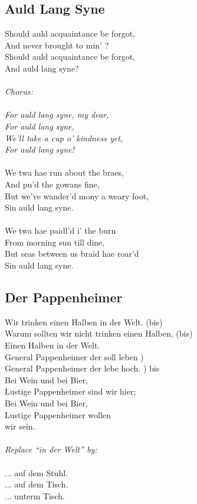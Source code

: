 \documentclass[a5paper]{article}
\begin{document}

\newpage

\subsection{Auld Lang Syne} %
\label{sub:auld_lang_syne}

Should auld acquaintance be forgot,\\
And never brought to min' ?\\
Should auld acquaintance be forgot,\\
And auld lang syne?\\
\\
\textit{Chorus:\\
\\
For auld lang syne, my dear,\\
For auld lang syne,\\
We'll take a cup o' kindness yet,\\
For auld lang syne!\\}
\\
We twa hae run about the braes,\\
And pu'd the gowans fine,\\
But we've wander'd mony a weary foot,\\
Sin auld lang syne.\\
\\
We twa hae paidl'd i’ the burn\\
From morning sun till dine,\\
But seas between us braid hae roar'd\\
Sin auld lang syne.\\


\newpage

\subsection{Der Pappenheimer} %
\label{sub:der_pappenheimer}

Wir trinken einen Halben in der Welt. (bis)\\
Warum sollten wir nicht trinken einen Halben, (bis)\\
Einen Halben in der Welt.\\
General Pappenheimer der soll leben )	 \\
General Pappenheimer der lebe hoch. ) bis\\
Bei Wein und bei Bier,\\
Lustige Pappenheimer sind wir hier;\\
Bei Wein und bei Bier,\\
Lustige Pappenheimer wollen \\wir sein.\\
\\
\textit{Replace ``in der Welt'' by:}\\
\\
... auf dem Stuhl.\\
... auf dem Tisch.\\
... unterm Tisch.\\
\end{document}
